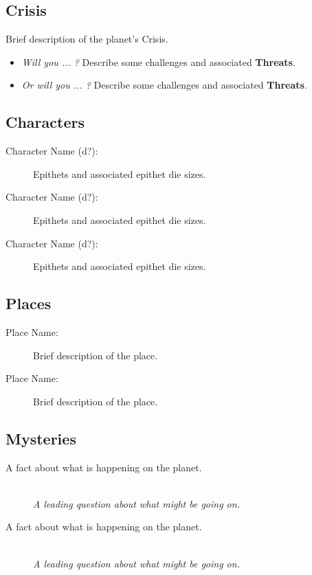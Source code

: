 \documentclass[11pt, a5paper, parskip=half-, DIV=12]{scrartcl}
\begin{document}
\subsection*{Crisis}
Brief description of the planet's Crisis.
\begin{itemize}
	\item \textit{Will you ... ?} Describe some challenges and associated \textbf{Threats}.
	\item \textit{Or will you ... ?} Describe some challenges and associated \textbf{Threats}.
\end{itemize}

\newpage

\subsection*{Characters}
\begin{description}
	\item[Character Name (d?):] Epithets and associated epithet die sizes.
	\item[Character Name (d?):] Epithets and associated epithet die sizes.
	\item[Character Name (d?):] Epithets and associated epithet die sizes.
\end{description}

\subsection*{Places}
\begin{description}
	\item[Place Name:] Brief description of the place.
	\item[Place Name:] Brief description of the place.
\end{description}

\subsection*{Mysteries}
\begin{description}
	\item[A fact about what is happening on the planet.] \phantom{a} \\ \textit{A leading question about what might be going on.}
	\item[A fact about what is happening on the planet.] \phantom{a} \\ \textit{A leading question about what might be going on.}
\end{description}
\end{document}
